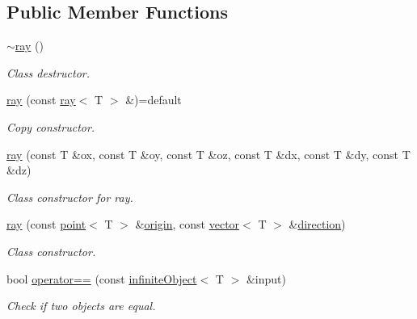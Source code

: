 \subsection*{Public Member Functions}
\begin{DoxyCompactItemize}
\item 
\mbox{\label{classddd_1_1ray_a1d3f28c826dfa86971a851ad6d385a53}} 
\hyperlink{classddd_1_1ray_a1d3f28c826dfa86971a851ad6d385a53}{$\sim$ray} ()
\begin{DoxyCompactList}\small\item\em Class destructor. \end{DoxyCompactList}\item 
\mbox{\label{classddd_1_1ray_a7262ad98c0ba222969241df6e3986f2d}} 
\hyperlink{classddd_1_1ray_a7262ad98c0ba222969241df6e3986f2d}{ray} (const \hyperlink{classddd_1_1ray}{ray}$<$ T $>$ \&)=default
\begin{DoxyCompactList}\small\item\em Copy constructor. \end{DoxyCompactList}\item 
\mbox{\label{classddd_1_1ray_ac3d4624fdf4cbdd1b211ce2b02957d35}} 
\hyperlink{classddd_1_1ray_ac3d4624fdf4cbdd1b211ce2b02957d35}{ray} (const T \&ox, const T \&oy, const T \&oz, const T \&dx, const T \&dy, const T \&dz)
\begin{DoxyCompactList}\small\item\em Class constructor for ray. \end{DoxyCompactList}\item 
\hyperlink{classddd_1_1ray_acac10719a90ebaa930a55f2aff5dd372}{ray} (const \hyperlink{classddd_1_1point}{point}$<$ T $>$ \&\hyperlink{classddd_1_1infinite_object_a0097f1df7ea358d410a73bdfcf2904f9}{origin}, const \hyperlink{classddd_1_1vector}{vector}$<$ T $>$ \&\hyperlink{classddd_1_1infinite_object_a7197d400db3804be122c78475c242a00}{direction})
\begin{DoxyCompactList}\small\item\em Class constructor. \end{DoxyCompactList}\item 
bool \hyperlink{classddd_1_1infinite_object_a7cd3342d60d4de4e4fc91d90fa9cc065}{operator==} (const \hyperlink{classddd_1_1infinite_object}{infinite\+Object}$<$ T $>$ \&input)
\begin{DoxyCompactList}\small\item\em Check if two objects are equal. \end{DoxyCompactList}\item 

\end{DoxyCompactItemize}
